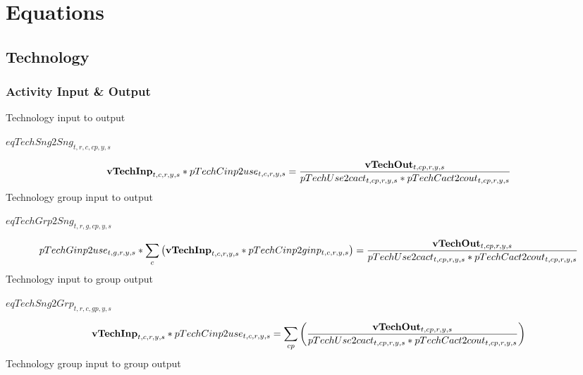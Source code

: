 \documentclass{article}
\begin{document}
\section*{Equations}
\subsection*{Technology}
\subsubsection*{Activity Input \& Output}
Technology input to output







$eqTechSng2Sng_{t,r,c,cp,y,s}$





\begin{dmath} 
{\bf vTechInp}_{t,c,r,y,s}*pTechCinp2use_{t,c,r,y,s}  =  \frac{{\bf vTechOut}_{t,cp,r,y,s}}{pTechUse2cact_{t,cp,r,y,s}*pTechCact2cout_{t,cp,r,y,s}}
\end{dmath} 
Technology group input to output







$eqTechGrp2Sng_{t,r,g,cp,y,s}$





\begin{dmath} 
pTechGinp2use_{t,g,r,y,s}*\sum_{c}{\left({\bf vTechInp}_{t,c,r,y,s}*pTechCinp2ginp_{t,c,r,y,s}\right)}  =  \frac{{\bf vTechOut}_{t,cp,r,y,s}}{pTechUse2cact_{t,cp,r,y,s}*pTechCact2cout_{t,cp,r,y,s}}
\end{dmath} 
Technology input to group output







$eqTechSng2Grp_{t,r,c,gp,y,s}$





\begin{dmath} 
{\bf vTechInp}_{t,c,r,y,s}*pTechCinp2use_{t,c,r,y,s}  =  \sum_{cp}{\left(\frac{{\bf vTechOut}_{t,cp,r,y,s}}{pTechUse2cact_{t,cp,r,y,s}*pTechCact2cout_{t,cp,r,y,s}}\right)}
\end{dmath} 
Technology group input to group output
\end{document}
